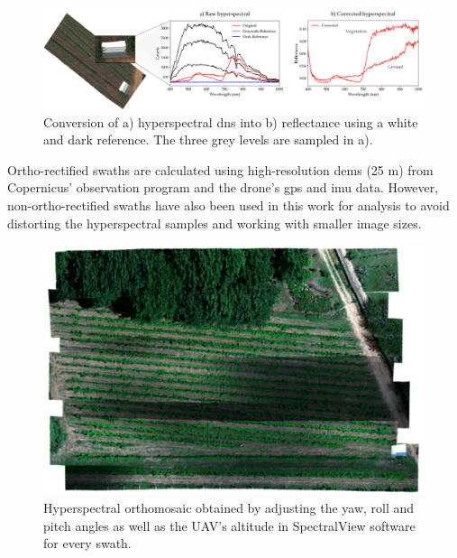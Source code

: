 \begin{figure}[ht]
    \centering
    \includegraphics{figs/materials/spectral_view_rectification.png}
    \caption{Conversion of a) hyperspectral \acrshort{dn}s into b) reflectance using a white and dark reference. The three grey levels are sampled in a).}
    \label{fig:hyperspectral_rectification}
\end{figure}

Ortho-rectified swaths are calculated using high-resolution \acrshort{dem}s (25 \si{\meter}) from Copernicus' observation program \cite{european_environment_agency_eu_2017} and the drone's \acrshort{gps} and \acrshort{imu} data. However, non-ortho-rectified swaths have also been used in this work for analysis to avoid distorting the hyperspectral samples and working with smaller image sizes.

\begin{figure}[ht]
    \centering
    \includegraphics[width=0.8\linewidth]{figs/materials/orthorectified_hyper.png}
    \caption{Hyperspectral orthomosaic obtained by adjusting the yaw, roll and pitch angles as well as the UAV's altitude in SpectralView\texttrademark \hspace{1mm} software for every swath.}
    \label{fig:orthorectified_hyper}
\end{figure}

